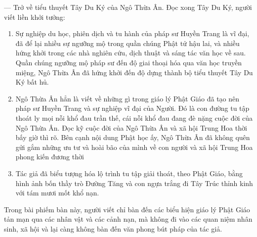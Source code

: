 --- Trở về tiểu thuyết Tây Du Ký của Ngô Thừa Ân. Đọc xong Tây Du Ký, người viết liền khởi tưởng:

\begin{enumerate}[label=\itshape\alph*\upshape/]
   \item Sự nghiệp du học, phiên dịch và tu hành của pháp sư Huyền Trang là vĩ đại, đã để lại nhiều sự ngưỡng mộ trong quần chúng Phật tử hậu lai, và nhiều hứng khởi trong các nhà nghiên cứu, dịch thuật và sáng tác văn học về sau. Quần chúng ngưỡng mộ pháp sư đến độ giai thoại hóa qua văn học truyền miệng, Ngô Thừa Ân đã hứng khởi đến độ dựng thành bộ tiểu thuyết Tây Du Ký bất hủ.

   \item Ngô Thừa Ân hẳn là viết về những gì trong giáo lý Phật Giáo đã tạo nên pháp sư Huyền Trang và sự nghiệp vĩ đại của Người. Đó là con đường tu tập thoát ly mọi nỗi khổ đau trần thế, cái nỗi khổ đau đang đè nặng cuộc đời của Ngô Thừa Ân. Đọc kỹ cuộc đời của Ngô Thừa Ân và xã hội Trung Hoa thời bấy giờ thì rõ. Bên cạnh nội dung Phật học ấy, Ngô Thừa Ân đã không quên gửi gắm những ưu tư và hoài bão của mình về con người và xã hội Trung Hoa phong kiến đương thời

   \item Tác giả đã biểu tượng hóa lộ trình tu tập giải thoát, theo Phật Giáo, bằng hình ảnh bốn thầy trò Đường Tăng và con ngựa trắng đi Tây Trúc thỉnh kinh với tám mươi mốt khổ nạn.
\end{enumerate}

Trong bài phiếm bàn này, người viết chỉ bàn đến các biểu hiện giáo lý Phật Giáo tản mạn qua các nhân vật và các cảnh nạn, mà không đi vào các quan niệm nhân sinh, xã hội và lại càng không bàn đến văn phong bút pháp của tác giả.

